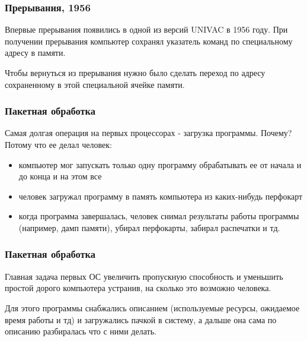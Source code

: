 \begin{frame}
\frametitle{Прерывания, 1956}

Впервые прерывания появились в одной из версий UNIVAC в 1956 году. При получении
прерывания компьютер сохранял указатель команд по специальному адресу в памяти.

Чтобы вернуться из прерывания нужно было сделать переход по адресу сохраненному
в этой специальной ячейке памяти.
\end{frame}

\begin{frame}
\frametitle{Пакетная обработка}

Самая долгая операция на первых процессорах - загрузка программы. Почему? Потому
что ее делал человек:
\begin{itemize}
  \item компьютер мог запускать только одну программу обрабатывать ее от начала
        и до конца и на этом все
  \item человек загружал программу в память компьютера из каких-нибудь перфокарт
  \item когда программа завершалась, человек снимал результаты работы программы
        (например, дамп памяти), убирал перфокарты, забирал распечатки и тд.
\end{itemize}
\end{frame}

\begin{frame}
\frametitle{Пакетная обработка}

Главная задача первых ОС увеличить пропускную способность и уменьшить простой
дорого компьютера устранив, на сколько это возможно человека.

Для этого программы снабжались описанием (используемые ресурсы, ожидаемое время
работы и тд) и загружались пачкой в систему, а дальше она сама по описанию
разбиралась что с ними делать.
\end{frame}
